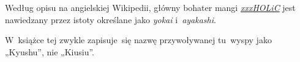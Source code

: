 \documentclass[a4paper,11pt]{article}
\begin{document}
\vspace{\spaceFour}



\start {} Według opisu na angielskiej Wikipedii, główny
bohater mangi
\href{https://en.wikipedia.org/wiki/XxxHolic}{\emph{xxxHOLiC}} jest
nawiedzany przez istoty określane jako \emph{yokai}
i~\emph{ayakashi}.

\vspace{\spaceFour}



\start {} W~książce tej zwykle zapisuje~się nazwę przywoływanej
tu~wyspy jako „Kyushu”, %
nie „Kiusiu”.





\end{document}

